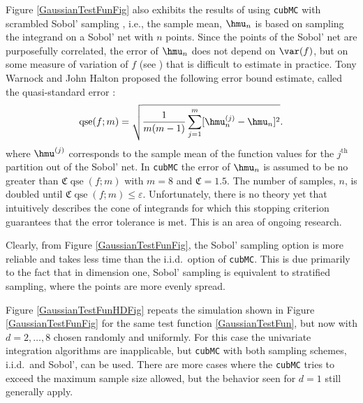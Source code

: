 \documentclass[graybox]{svmult}
\newcommand{\fudge}{\mathfrak{C}}
\DeclareMathOperator{\qse}{qse}
\newcommand{\aMC}{{\tt cubMC}\xspace}
\begin{document}
Figure \ref{GaussianTestFunFig} also exhibits the results of using \aMC with scrambled Sobol' sampling \citep{Owe95,Owe96,Owe97,Mat98,HonHic00a,DicPil10a}, i.e., the sample mean,  $\hmu_n$ is based on sampling the integrand on a Sobol' net with $n$ points.  Since the points of the Sobol' net are purposefully correlated, the error of $\hmu_n$ does not depend on $\var(f)$, but on some measure of variation of $f$ (see \citep{Owe95,Owe96,Owe97,DicPil10a}) that is difficult to estimate in practice.  Tony Warnock and John Halton proposed the following error bound estimate, called the quasi-standard error \citep{Hal05a,Owe06a}:
\begin{equation} \label{qsedef}
\qse(f;m) = \sqrt{\frac{1}{m(m-1)} \sum_{j=1}^m  [\hmu^{(j)}_n - \hmu_n]^2}.
\end{equation}
where $\hmu^{(j)}$ corresponds to the sample mean of the function values for the $j^{\text{th}}$ partition out of the Sobol' net.  In \aMC the error of $\hmu_n$ is assumed to be no greater than  $\fudge \qse(f;m)$ with $m=8$ and $\fudge=1.5$.  The number of samples, $n$, is doubled until $\fudge \qse(f;m) \le \varepsilon$.  Unfortunately, there is no theory yet that intuitively describes the cone of integrands for which this stopping criterion guarantees that the error tolerance is met.  This is an area of ongoing research.

Clearly, from Figure \ref{GaussianTestFunFig}, the Sobol' sampling option is more reliable and takes less time than the i.i.d.\ option of \aMC.  This is due primarily to the fact that in dimension one, Sobol' sampling is equivalent to stratified sampling, where the points are more evenly spread.

Figure \ref{GaussianTestFunHDFig} repeats the simulation shown in Figure \ref{GaussianTestFunFig} for the same test function \eqref{GaussianTestFun}, but now with $d=2, \ldots, 8$ chosen randomly and uniformly.  For this case the univariate integration algorithms are inapplicable, but \aMC with both sampling schemes, i.i.d.\ and Sobol', can be used.  There are more cases where the \aMC tries to exceed the maximum sample size allowed, but the behavior seen for $d=1$ still generally apply.  
\end{document}
